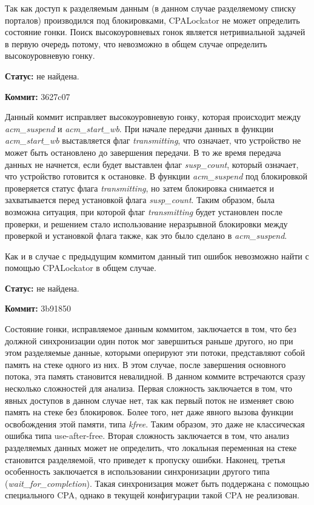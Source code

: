 Так как доступ к разделяемым данным (в данном случае разделяемому списку порталов) производился под блокировками, CPALockator не может определить состояние гонки.
Поиск высокоуровневых гонок является нетривиальной задачей в первую очередь потому, что невозможно в общем случае определить высокоуровневую гонку.

\textbf{Статус:} не найдена.

\vspace{1cm}

\textbf{Коммит:} 3627c07

Данный коммит исправляет высокоуровневую гонку, которая происходит между \textit{acm\_suspend} и \textit{acm\_start\_wb}.
При начале передачи данных в функции \textit{acm\_start\_wb} выставляется флаг \textit{transmitting}, что означает, что устройство не может быть остановлено до завершения передачи.
В то же время передача данных не начнется, если будет выставлен флаг \textit{susp\_count}, который означает, что устройство готовится к остановке.
В функции \textit{acm\_suspend} под блокировкой проверяется статус флага \textit{transmitting}, но затем блокировка снимается и захватывается перед установкой флага \textit{susp\_count}.
Таким образом, была возможна ситуация, при которой флаг \textit{transmitting} будет установлен после проверки, и решением стало использование неразрывной блокировки между проверкой и установкой флага также, как это было сделано в \textit{acm\_suspend}.

Как и в случае с предыдущим коммитом данный тип ошибок невозможно найти с помощью CPALockator в общем случае.

\textbf{Статус:} не найдена.

\vspace{1cm}

\textbf{Коммит:} 3b91850

Состояние гонки, исправляемое данным коммитом, заключается в том, что без должной синхронизации один поток мог завершиться раньше другого, но при этом разделяемые данные, которыми оперируют эти потоки, представляют собой память на стеке одного из них.
В этом случае, после завершения основного потока, эта память становится невалидной. 
В данном коммите встречаются сразу несколько сложностей для анализа.
Первая сложность заключается в том, что явных доступов в данном случае нет, так как первый поток не изменяет свою память на стеке без блокировок.
Более того, нет даже явного вызова функции освобождения этой памяти, типа \textit{kfree}.
Таким образом, это даже не классическая ошибка типа use-after-free.
Вторая сложность заключается в том, что анализ разделяемых данных может не определить, что локальная переменная на стеке становится разделяемой, что приведет к пропуску ошибки.
Наконец, третья особенность заключается в использовании синхронизации другого типа (\textit{wait\_for\_completion}).
Такая синхронизация может быть поддержана с помощью специального CPA, однако в текущей конфигурации такой CPA не реализован.


